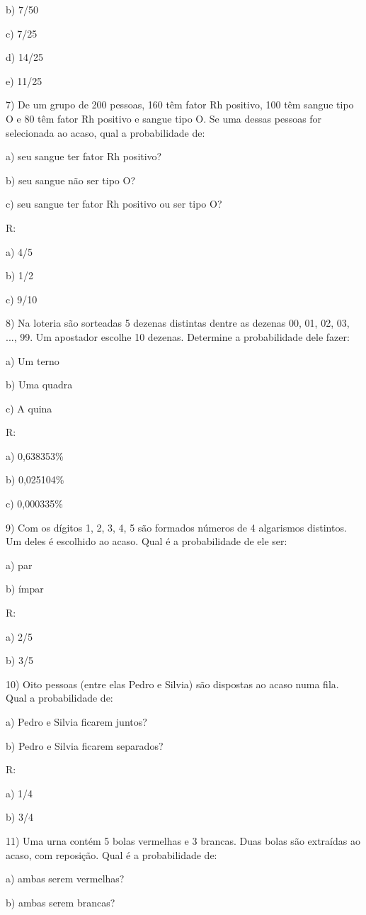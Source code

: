 b) 7/50

c) 7/25

d) 14/25

e) 11/25

7) De um grupo de 200 pessoas, 160 têm fator Rh positivo, 100 têm sangue
tipo O e 80 têm fator Rh positivo e sangue tipo O. Se uma dessas pessoas
for selecionada ao acaso, qual a probabilidade de:

a) seu sangue ter fator Rh positivo?

b) seu sangue não ser tipo O?

c) seu sangue ter fator Rh positivo ou ser tipo O?

R:

a) 4/5

b) 1/2

c) 9/10

8) Na loteria são sorteadas 5 dezenas distintas dentre as dezenas 00,
01, 02, 03, ..., 99. Um apostador escolhe 10 dezenas. Determine a
probabilidade dele fazer:

a) Um terno

b) Uma quadra

c) A quina

R:

a) 0,638353\%

b) 0,025104\%

c) 0,000335\%

9) Com os dígitos 1, 2, 3, 4, 5 são formados números de 4 algarismos
distintos. Um deles é escolhido ao acaso. Qual é a probabilidade de ele
ser:

a) par

b) ímpar

R:

a) 2/5

b) 3/5

10) Oito pessoas (entre elas Pedro e Silvia) são dispostas ao acaso numa
fila. Qual a probabilidade de:

a) Pedro e Silvia ficarem juntos?

b) Pedro e Silvia ficarem separados?

R:

a) 1/4

b) 3/4

11) Uma urna contém 5 bolas vermelhas e 3 brancas. Duas bolas são
extraídas ao acaso, com reposição. Qual é a probabilidade de:

a) ambas serem vermelhas?

b) ambas serem brancas?

